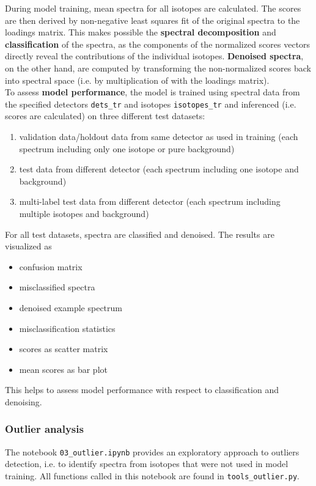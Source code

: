 \documentclass[preprint,12pt, a4paper]{elsarticle}
\begin{document}
During model training, mean spectra for all isotopes are calculated. The scores are then derived by non-negative least squares fit of the original spectra to the loadings matrix. This makes possible the \textbf{spectral decomposition} and \textbf{classification} of the spectra, as the components of the normalized scores vectors directly reveal the contributions of the individual isotopes. \textbf{Denoised spectra}, on the other hand, are computed by transforming the non-normalized scores back into spectral space (i.e. by multiplication of with the loadings matrix). \\

To assess \textbf{model performance}, the model is trained using spectral data from the specified detectors \texttt{dets\_tr} and isotopes \texttt{isotopes\_tr} and inferenced (i.e. scores are calculated) on three different test datasets:
\begin{enumerate}
\item validation data/holdout data from same detector as used in training (each spectrum including 
only one isotope or pure background)
\item test data from different detector (each spectrum including one isotope and background)
\item multi-label test data from different detector (each spectrum including multiple isotopes and background)
\end{enumerate}


For all test datasets, spectra are classified and denoised. The results are visualized as 
\begin{itemize}
\item confusion matrix  
\item misclassified spectra  
\item denoised example spectrum  
\item misclassification statistics  
\item scores as scatter matrix  
\item mean scores as bar plot
\end{itemize}
  
This helps to assess model performance with respect to classification and denoising. 

\subsubsection{Outlier analysis}
\label{sec:outlier_analysis}
The notebook \texttt{03\_outlier.ipynb} provides an exploratory approach to outliers detection, i.e. to identify spectra from isotopes that were not used in model training. All functions called in this notebook are found in \texttt{tools\_outlier.py}. 
\end{document}
